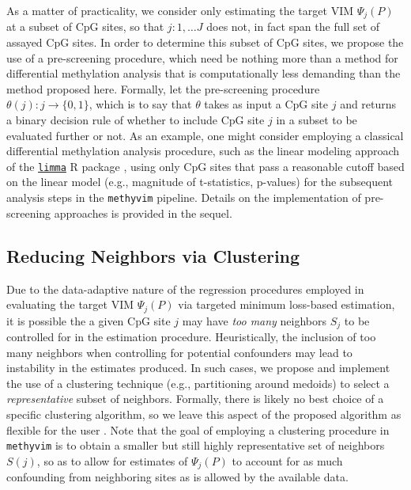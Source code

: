 \documentclass[9pt,a4paper,]{extarticle}
\theoremstyle{definition}
\theoremstyle{definition}
\theoremstyle{definition}
\theoremstyle{remark}
\begin{document}
As a matter of practicality, we consider only estimating the target VIM
\(\Psi_j(P)\) at a subset of CpG sites, so that \(j: 1, \ldots J\) does not, in fact
span the full set of assayed CpG sites. In order to determine this subset of CpG
sites, we propose the use of a pre-screening procedure, which need be nothing
more than a method for differential methylation analysis that is computationally
less demanding than the method proposed here. Formally, let the pre-screening
procedure \(\theta(j): j \to \{0, 1\}\), which is to say that \(\theta\) takes as
input a CpG site \(j\) and returns a binary decision rule of whether to include
CpG site \(j\) in a subset to be evaluated further or not. As an example, one
might consider employing a classical differential methylation analysis
procedure, such as the linear modeling approach of the
\href{https://bioconductor.org/packages/limma}{\texttt{limma}} R package
\citep[\citet{robinson2014statistical}]{smyth2004linear}, using only CpG sites that pass a
reasonable cutoff based on the linear model (e.g., magnitude of t-statistics,
p-values) for the subsequent analysis steps in the \texttt{methyvim} pipeline. Details
on the implementation of pre-screening approaches is provided in the sequel.

\hypertarget{reducing-neighbors-via-clustering}{%
\subsection{Reducing Neighbors via Clustering}\label{reducing-neighbors-via-clustering}}

Due to the data-adaptive nature of the regression procedures employed in
evaluating the target VIM \(\Psi_j(P)\) via targeted minimum loss-based
estimation, it is possible the a given CpG site \(j\) may have \emph{too many}
neighbors \(S_j\) to be controlled for in the estimation procedure. Heuristically,
the inclusion of too many neighbors when controlling for potential confounders
may lead to instability in the estimates produced. In such cases, we propose and
implement the use of a clustering technique (e.g., partitioning around medoids)
to select a \emph{representative} subset of neighbors. Formally, there is likely no
best choice of a specific clustering algorithm, so we leave this aspect of the
proposed algorithm as flexible for the user \citep{kleinberg2003impossibility}. Note
that the goal of employing a clustering procedure in \texttt{methyvim} is to obtain a
smaller but still highly representative set of neighbors \(S(j)\), so as to allow
for estimates of \(\Psi_j(P)\) to account for as much confounding from neighboring
sites as is allowed by the available data.
\end{document}
